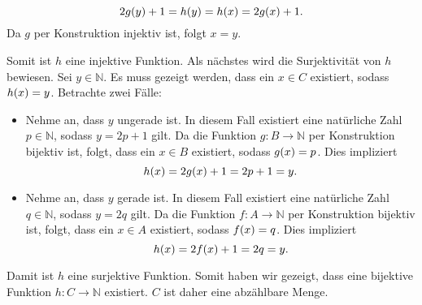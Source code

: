 \documentclass[german,12pt]{homework}
\newcommand{\NN}{\mathbb{N}}
\DeclarePairedDelimiter{\enbrace}{(}{)}
\begin{document}
\begin{enumerate}
\begin{itemize}
            \[2g\enbrace*{y} + 1 = h\enbrace*{y} = h\enbrace*{x} =
            2g\enbrace*{x} + 1.\]
            Da \(g\) per Konstruktion injektiv ist, folgt \(x = y\).
        \end{itemize}
        Somit ist \(h\) eine injektive Funktion. Als nächstes wird die
        Surjektivität von \(h\) bewiesen. Sei \(y \in \NN\). Es muss gezeigt
        werden, dass ein \(x \in C\) existiert, sodass \(h\enbrace*{x} = y\).
        Betrachte zwei Fälle:
        \begin{itemize}
            \item Nehme an, dass \(y\) ungerade ist. In diesem Fall existiert
            eine natürliche Zahl \(p \in \NN\), sodass \(y = 2p + 1\) gilt. Da
            die Funktion \(g: B \to \NN\) per Konstruktion bijektiv ist, folgt,
            dass ein \(x \in B\) existiert, sodass \(g\enbrace*{x} = p\). Dies
            impliziert
            \[h\enbrace*{x} = 2g\enbrace*{x} + 1 = 2p + 1 = y.\]
            \item Nehme an, dass \(y\) gerade ist. In diesem Fall existiert
            eine natürliche Zahl \(q \in \NN\), sodass \(y = 2q\) gilt. Da die
            Funktion \(f: A \to \NN\) per Konstruktion bijektiv ist, folgt,
            dass ein \(x \in A\) existiert, sodass \(f\enbrace*{x} = q\). Dies
            impliziert
            \[h\enbrace*{x} = 2f\enbrace*{x} + 1 = 2q = y.\]
        \end{itemize}
        Damit ist \(h\) eine surjektive Funktion. Somit haben wir gezeigt, dass
        eine bijektive Funktion \(h: C \to \NN\) existiert. \(C\) ist daher
        eine abzählbare Menge.


\end{enumerate}
\end{document}
